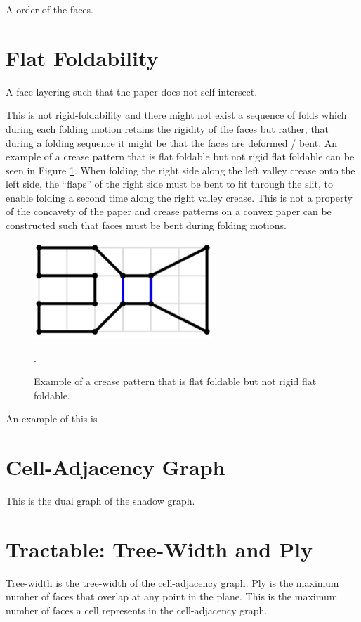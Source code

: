 A order of the faces.


\section{Flat Foldability}

A face layering such that the paper does not self-intersect.

This is not rigid-foldability and there might not exist a sequence of folds which during each folding motion retains the rigidity of the faces but rather, that during a folding sequence it might be that the faces are deformed / bent.
An example of a crease pattern that is flat foldable but not rigid flat foldable can be seen in Figure \ref{fig:example_non_rigid}.
When folding the right side along the left valley crease onto the left side, the ``flaps'' of the right side must be bent to fit through the slit, to enable folding a second time along the right valley crease.
This is not a property of the concavety of the paper and crease patterns on a convex paper can be constructed such that faces must be bent during folding motions.

\begin{figure}[h]
\centering
\includegraphics[width=0.6\textwidth]{assets/example_non_rigid.png}
\caption{Example of a crease pattern that is flat foldable but not rigid flat foldable.}.
\label{fig:example_non_rigid}
\end{figure}

An example of this is

\section{Cell-Adjacency Graph}

This is the dual graph of the shadow graph.

\section{Tractable: Tree-Width and Ply}

Tree-width is the tree-width of the cell-adjacency graph.
Ply is the maximum number of faces that overlap at any point in the plane.
This is the maximum number of faces a cell represents in the cell-adjacency graph.

